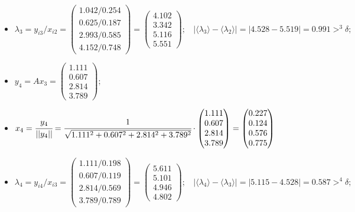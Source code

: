 \begin{itemize}
    \item
    $\lambda_3 = y_{i3} / x_{i2} =
    \begin{pmatrix}
        1.042/0.254\\
        0.625/0.187\\
        2.993/0.585\\
        4.152/0.748
    \end{pmatrix} =
    \begin{pmatrix}
        4.102\\3.342\\5.116\\5.551
    \end{pmatrix};~~~~
    |\langle\lambda_3\rangle-\langle\lambda_2\rangle| = |4.528-5.519| = 0.991 >^3 \delta;$



    \item
    $y_4 = Ax_3 =
    \begin{pmatrix}
        1.111\\0.607\\2.814\\3.789
    \end{pmatrix};$

    \item
    $x_4 = \cfrac{y_4}{||y_4||} = \cfrac{1}{\sqrt{1.111^2+0.607^2+2.814^2+3.789^2}}\cdot
    \begin{pmatrix}
        1.111\\0.607\\2.814\\3.789
    \end{pmatrix} =
    \begin{pmatrix}
        0.227\\0.124\\0.576\\0.775
    \end{pmatrix}$

    \item
    $\lambda_4 = y_{i4} / x_{i3} =
    \begin{pmatrix}
        1.111/0.198\\
        0.607/0.119\\
        2.814/0.569\\
        3.789/0.789
    \end{pmatrix} =
    \begin{pmatrix}
        5.611\\5.101\\4.946\\4.802
    \end{pmatrix};~~~~
    |\langle\lambda_4\rangle-\langle\lambda_3\rangle| = |5.115-4.528| = 0.587 >^4 \delta;$




\end{itemize}
